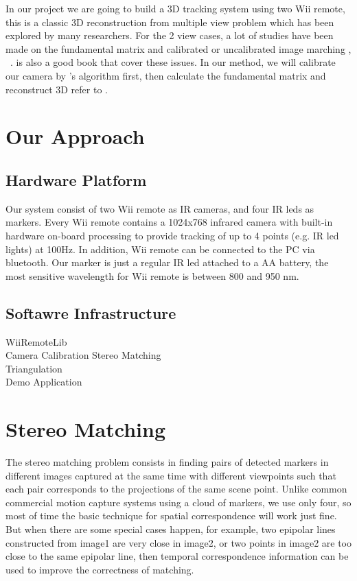 \documentclass[10pt,twocolumn,letterpaper]{article}
\begin{document}
In our project we are going to build a 3D tracking system using two Wii
remote, this is a classic 3D reconstruction from multiple view problem 
which has been explored by many researchers. For the 2 view cases, 
a lot of studies have been made on the fundamental 
matrix and calibrated or uncalibrated image marching
\cite{luong95},\cite{Higgins87} \cite{Zhang95}~\cite{Hartley95}. 
\cite{Hartley03} is also a good book that cover these issues. 
In our method, we will calibrate our camera by \cite{Zhang00}'s 
algorithm first, then calculate the fundamental matrix 
and reconstruct 3D refer to \cite{Faugeras92}.

\section{Our Approach}


\subsection{Hardware Platform}
Our system consist of two Wii remote as IR cameras, and four IR leds as markers.
Every Wii remote contains a 1024x768 infrared camera 
with built-in hardware on-board processing to provide 
tracking of up to 4 points (e.g. IR led lights) at 100Hz. 
In addition, Wii remote can be connected to the PC via bluetooth. 
Our marker is just a regular IR led attached to a AA battery, 
the most sensitive wavelength for Wii remote is between 800 and 950 nm.

\subsection{Softawre Infrastructure}

WiiRemoteLib\\
Camera Calibration
Stereo Matching\\
Triangulation\\
Demo Application\\


\section{Stereo Matching}
The stereo matching problem consists in finding pairs of detected 
markers in different images captured at the same time with different 
viewpoints such that each pair corresponds to the projections of the
 same scene point. Unlike common commercial motion capture systems 
using a cloud of markers, we use only four, so most of time the basic
 technique for spatial correspondence will work just fine. But when there 
are some special cases happen, for example, two epipolar lines constructed
from image1 are very close in image2, or two points in image2 are too close
to the same epipolar line, then temporal correspondence information can 
be used to improve the correctness of matching.
\end{document}
